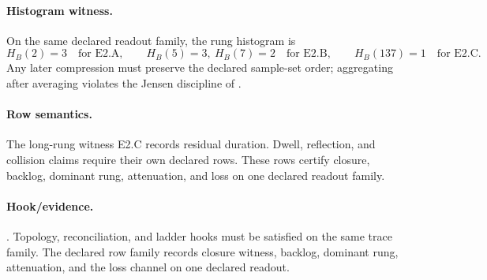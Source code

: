 \paragraph{Histogram witness.} On the same declared readout family, the rung histogram is
\[
H_B(2)=3\quad\text{for E2.A},
\qquad
H_B(5)=3,\ H_B(7)=2\quad\text{for E2.B},
\qquad
H_B(137)=1\quad\text{for E2.C}.
\]
Any later compression must preserve the declared sample-set order; aggregating after averaging violates the Jensen discipline of .

\paragraph{Row semantics.} The long-rung witness E2.C records residual duration. Dwell, reflection, and collision claims require their own declared rows. These rows certify closure, backlog, dominant rung, attenuation, and loss on one declared readout family.

\paragraph{Hook/evidence.} . Topology, reconciliation, and ladder hooks must be satisfied on the same trace family. The declared row family records closure witness, backlog, dominant rung, attenuation, and the loss channel on one declared readout.
